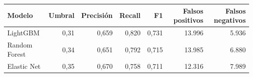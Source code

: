
\begin{tabular}{lrrrrrr}
\toprule
Modelo & Umbral & Precisión & Recall & F1 & Falsos positivos & Falsos negativos\\
\midrule
LightGBM & 0,31 & 0,659 & 0,820 & 0,731 & 13.996 & 5.936\\
Random Forest & 0,34 & 0,651 & 0,792 & 0,715 & 13.985 & 6.880\\
Elastic Net & 0,35 & 0,670 & 0,758 & 0,711 & 12.316 & 7.989\\
\bottomrule
\end{tabular}
